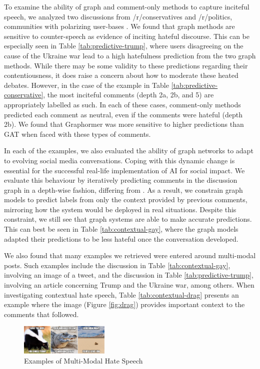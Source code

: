 \documentclass[letterpaper]{article} %
\begin{document}
To examine the ability of graph and comment-only methods to capture inciteful speech, we analyzed two discussions from /r/conservatives and /r/politics, communities with polarizing user-bases \cite{Waller2021}. We found that graph methods are sensitive to counter-speech as evidence of inciting hateful discourse. This can be especially seen in Table \ref{tab:predictive-trump}, where users disagreeing on the cause of the Ukraine war lead to a high hatefulness prediction from the two graph methods. While there may be some validity to these predictions regarding their contentiousness, it does raise a concern about how to moderate these heated debates.
However, in the case of the example in Table \ref{tab:predictive-conservative}, the most inciteful comments (depth 2a, 2b, and 5) are appropriately labelled as such. In each of these cases, comment-only methods predicted each comment as neutral, even if the comments were hateful (depth 2b). We found that Graphormer was more sensitive to higher predictions than GAT when faced with these types of comments.

In each of the examples, we also evaluated the ability of graph networks to adapt to evolving social media conversations. Coping with this dynamic change is essential for the successful real-life implementation of AI for social impact. We evaluate this behaviour by iteratively predicting comments in the discussion graph in a depth-wise fashion, differing from \citet{hebert2022predicting}. As a result, we constrain graph models to predict labels from only the context provided by previous comments, mirroring how the system would be deployed in real situations. Despite this constraint, we still see that graph systems are able to make accurate predictions. This can best be seen in Table \ref{tab:contextual-gay}, where the graph models adapted their predictions to be less hateful once the conversation developed.

We also found that many examples we retrieved were entered around multi-modal posts. Such examples include the discussion in Table \ref{tab:contextual-gay}, involving an image of a tweet, and the discussion in Table \ref{tab:predictive-trump}, involving an article concerning Trump and the Ukraine war, among others. When investigating contextual hate speech, Table \ref{tab:contextual-drag} presents an example where the image (Figure \ref{fig:drag}) provides important context to the comments that followed.

\begin{figure}
\centering
\includegraphics[width=0.504\linewidth,height=0.57in ]{hatefulmemes.png}
\caption{Examples of Multi-Modal Hate Speech}
\label{fig:multimodal}
\end{figure}
\end{document}

